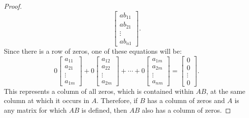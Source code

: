 \documentclass{article}
\begin{document}
\begin{question}{1.3}{}
{\begin{enumerate}
\begin{proof}
\[          \begin{bmatrix}ab_{11} \\ ab_{21} \\ \vdots \\ ab_{n1} \end{bmatrix}.
        \]
        Since there is a row of zeros, one of these equations will be:
        \[
          0\begin{bmatrix} a_{11} \\ a_{21} \\ \vdots \\ a_{1m}\end{bmatrix} +
          0\begin{bmatrix} a_{12} \\ a_{22} \\ \vdots \\ a_{2m}\end{bmatrix} + \cdots +
          0\begin{bmatrix} a_{1m} \\ a_{2m} \\ \vdots \\ a_{nm}\end{bmatrix} =
          \begin{bmatrix}0 \\ 0 \\ \vdots \\ 0 \end{bmatrix}.
        \]
        This represents a column of all zeros, which is contained within $AB$, at the same column at which it occurs in $A$. Therefore, if $B$ has a column of zeros and $A$ is any matrix for which $AB$ is defined, then $AB$ also has a column of zeros.
      \end{proof}
    \end{enumerate}}
\end{question}
\end{document}
